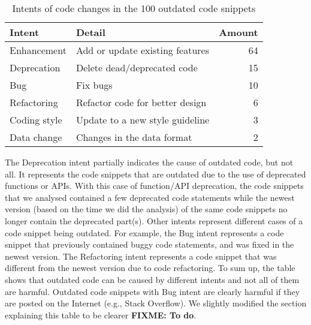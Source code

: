 \documentclass[a4paper,twoside,10pt]{reviewresponse}
\newcommand\FIXME[1]{{\color{red}\textbf{FIXME: #1}}}
\begin{document}
\begin{table}[H]
	\centering
	\begin{tabular}{llr}
		\toprule
		Intent & Detail & Amount \\
		\midrule
		Enhancement & Add or update existing features & 64 \\
		Deprecation & Delete dead/deprecated code & 15 \\
		Bug & Fix bugs & 10 \\
		Refactoring & Refactor code for better design & 6 \\
		Coding style & Update to a new style guideline & 3 \\
		Data change & Changes in the data format & 2 \\
		\bottomrule
	\end{tabular}
	\label{tab:intent_outdated}
	\caption{Intents of code changes in the 100 outdated code snippets}
\end{table}

The Deprecation intent partially indicates the cause of outdated code, but not all. It represents the code snippets that are outdated due to the use of deprecated functions or APIs. With this case of function/API deprecation, the code snippets that we analysed contained a few deprecated code statements while the newest version (based on the time we did the analysis) of the same code snippets no longer contain the deprecated part(s). Other intents represent different cases of a code snippet being outdated. For example, the Bug intent represents a code snippet that previously contained buggy code statements, and was fixed in the newest version. The Refactoring intent represents a code snippet that was different from the newest version due to code refactoring.
To sum up, the table shows that outdated code can be caused by different intents and not all of them are harmful. Outdated code snippets with Bug intent are clearly harmful if they are posted on the Internet (e.g., Stack Overflow). We slightly modified the section explaining this table to be clearer \FIXME{To do}.

\end{document}
